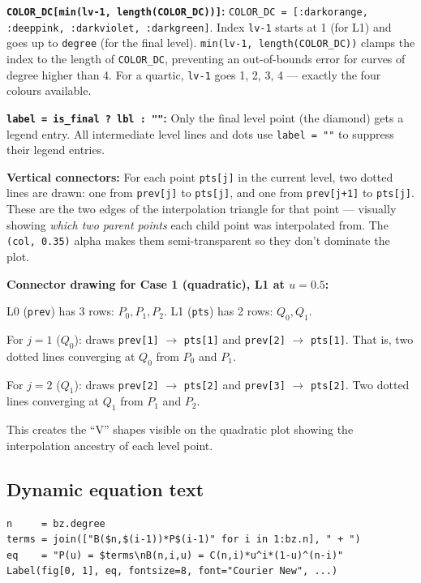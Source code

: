 \documentclass[12pt, a4paper]{article}
\newcommand{\cd}[1]{\texttt{#1}}
\begin{document}
\textbf{\cd{COLOR\_DC[min(lv-1, length(COLOR\_DC))]}:}
\cd{COLOR\_DC = [:darkorange, :deeppink, :darkviolet, :darkgreen]}.
Index \cd{lv-1} starts at 1 (for L1) and goes up to
\cd{degree} (for the final level).
\cd{min(lv-1, length(COLOR\_DC))} clamps the index to
the length of \cd{COLOR\_DC}, preventing an out-of-bounds
error for curves of degree higher than 4.
For a quartic, \cd{lv-1} goes 1, 2, 3, 4 --- exactly
the four colours available.

\textbf{\cd{label = is\_final ? lbl : ""}:}
Only the final level point (the diamond) gets a legend
entry.
All intermediate level lines and dots use \cd{label = ""}
to suppress their legend entries.

\textbf{Vertical connectors:}
For each point \cd{pts[j]} in the current level,
two dotted lines are drawn: one from \cd{prev[j]}
to \cd{pts[j]}, and one from \cd{prev[j+1]} to
\cd{pts[j]}.
These are the two edges of the interpolation triangle
for that point --- visually showing \emph{which two
parent points} each child point was interpolated from.
The \cd{(col, 0.35)} alpha makes them semi-transparent
so they don't dominate the plot.

\begin{examplebox}
\textbf{Connector drawing for Case 1 (quadratic), L1 at $u=0.5$:}

L0 (\cd{prev}) has 3 rows: $P_0, P_1, P_2$.
L1 (\cd{pts}) has 2 rows: $Q_0, Q_1$.

For $j=1$ ($Q_0$): draws \cd{prev[1]} $\to$ \cd{pts[1]}
and \cd{prev[2]} $\to$ \cd{pts[1]}.
That is, two dotted lines converging at $Q_0$ from
$P_0$ and $P_1$.

For $j=2$ ($Q_1$): draws \cd{prev[2]} $\to$ \cd{pts[2]}
and \cd{prev[3]} $\to$ \cd{pts[2]}.
Two dotted lines converging at $Q_1$ from $P_1$ and $P_2$.

This creates the ``V'' shapes visible on the quadratic plot
showing the interpolation ancestry of each level point.
\end{examplebox}

\subsection{Dynamic equation text}

\begin{verbatim}
n     = bz.degree
terms = join(["B($n,$(i-1))*P$(i-1)" for i in 1:bz.n], " + ")
eq    = "P(u) = $terms\nB(n,i,u) = C(n,i)*u^i*(1-u)^(n-i)"
Label(fig[0, 1], eq, fontsize=8, font="Courier New", ...)
\end{verbatim}
\end{document}
